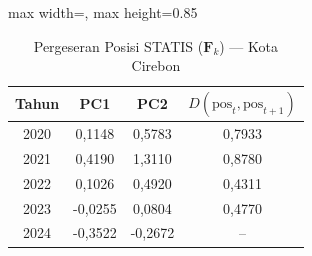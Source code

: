 \begin{table}[H]
\centering
\caption{Pergeseran Posisi STATIS ($\mathbf{F}_k$) --- Kota Cirebon} \label{tab:app2jarak_statis_skor_kota_cirebon}
\begin{adjustbox}{max width=\textwidth, max height=0.85\textheight}
\begin{tabular}{|c|c|c|c|}
\hline
\textbf{Tahun} & \textbf{PC1} & \textbf{PC2} & \textbf{$D(\text{pos}_t, \text{pos}_{t+1})$} \\
\hline
2020 & 0,1148 & 0,5783 & 0,7933 \\
2021 & 0,4190 & 1,3110 & 0,8780 \\
2022 & 0,1026 & 0,4920 & 0,4311 \\
2023 & -0,0255 & 0,0804 & 0,4770 \\
2024 & -0,3522 & -0,2672 & -- \\
\hline
\end{tabular}
\end{adjustbox}
\end{table}